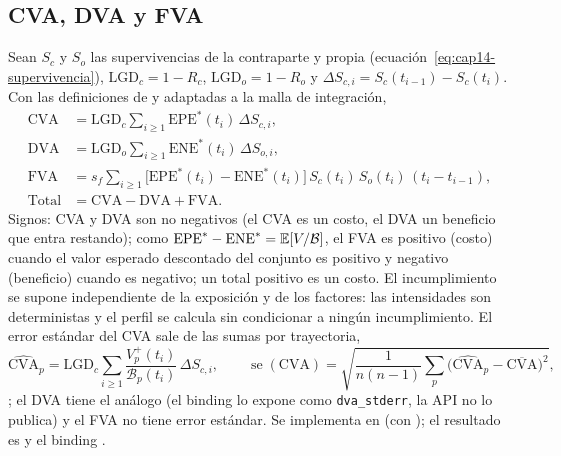 \begin{sloppypar}
\subsection{CVA, DVA y FVA}\label{sec:cap14-xva}

Sean $S_c$ y $S_o$ las supervivencias de la contraparte y propia (ecuación~\eqref{eq:cap14-supervivencia}),
$\mathrm{LGD}_c=1-R_c$, $\mathrm{LGD}_o=1-R_o$ y $\Delta S_{c,i}=S_c(t_{i-1})-S_c(t_i)$. Con las definiciones de
\citet{gregory2015} y \citet{brigo2013} adaptadas a la malla de integración,
\begin{align}
  \mathrm{CVA}&=\mathrm{LGD}_c\sum_{i\ge1}\mathrm{EPE}^*(t_i)\,\Delta S_{c,i}, \label{eq:cap14-cva}\\
  \mathrm{DVA}&=\mathrm{LGD}_o\sum_{i\ge1}\mathrm{ENE}^*(t_i)\,\Delta S_{o,i}, \label{eq:cap14-dva}\\
  \mathrm{FVA}&=s_f\sum_{i\ge1}\bigl[\mathrm{EPE}^*(t_i)-\mathrm{ENE}^*(t_i)\bigr]\,S_c(t_i)\,S_o(t_i)\,(t_i-t_{i-1}), \label{eq:cap14-fva}\\
  \mathrm{Total}&=\mathrm{CVA}-\mathrm{DVA}+\mathrm{FVA}. \label{eq:cap14-total}
\end{align}
Signos: CVA y DVA son no negativos (el CVA es un costo, el DVA un beneficio que entra restando); como
$\mathrm{EPE}^*-\mathrm{ENE}^*=\mathbb{E}[V/\mathcal B]$, el FVA es positivo (costo) cuando el valor esperado descontado del
conjunto es positivo y negativo (beneficio) cuando es negativo; un total positivo es un costo. El incumplimiento se
supone independiente de la exposición y de los factores: las intensidades son deterministas y el perfil se
calcula sin condicionar a ningún incumplimiento. El error estándar del CVA sale de las sumas por trayectoria,
\begin{equation}\label{eq:cap14-stderr}
  \widehat{\mathrm{CVA}}_p=\mathrm{LGD}_c\sum_{i\ge1}\frac{V_p^+(t_i)}{\mathcal B_p(t_i)}\,\Delta S_{c,i},\qquad
  \operatorname{se}(\mathrm{CVA})=\sqrt{\frac{1}{n(n-1)}\sum_{p}\bigl(\widehat{\mathrm{CVA}}_p-\overline{\mathrm{CVA}}\bigr)^{2}},
\end{equation}
\citep[cap.~1]{glasserman2003}; el DVA tiene el análogo (el binding lo expone como \texttt{dva\_stderr}, la API no lo
publica) y el FVA no tiene error estándar. Se implementa en 
(con ); el resultado es
 y el binding .


\end{sloppypar}
